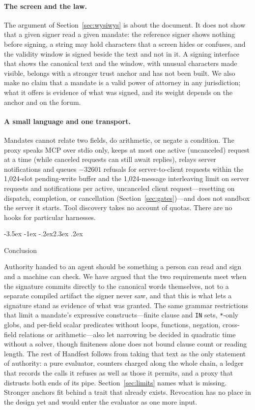 \documentclass[10pt,twocolumn]{article}
\makeatletter
\theoremstyle{plain}
\theoremstyle{definition}
\renewcommand\section{\@startsection{section}{1}{\z@}%
  {-3.5ex \@plus -1ex \@minus -.2ex}{2.3ex \@plus .2ex}%
  {\normalfont\Large\bfseries\raggedright}}
\makeatother
\begin{document}
\paragraph{The screen and the law.}
The argument of Section~\ref{sec:wysiwys} is about the document. It does not show that a given signer read a given mandate: the reference signer shows nothing before signing, a string may hold characters that a screen hides or confuses, and the validity window is signed beside the text and not in it. A signing interface that shows the canonical text and the window, with unusual characters made visible, belongs with a stronger trust anchor and has not been built. We also make no claim that a mandate is a valid power of attorney in any jurisdiction; what it offers is evidence of what was signed, and its weight depends on the anchor and on the forum.

\paragraph{A small language and one transport.}
Mandates cannot relate two fields, do arithmetic, or negate a condition. The proxy speaks MCP over stdio only, keeps at most one active (uncanceled) request at a time (while canceled requests can still await replies), relays server notifications and queues $-32601$ refusals for server-to-client requests within the 1{,}024-slot pending-write buffer and the 1{,}024-message interleaving limit on server requests and notifications per active, uncanceled client request---resetting on dispatch, completion, or cancellation (Section~\ref{sec:gates})---and does not sandbox the server it starts. Tool discovery takes no account of quotas. There are no hooks for particular harnesses.

\section{Conclusion}
\label{sec:conclusion}

Authority handed to an agent should be something a person can read and sign and a machine can check. We have argued that the two requirements meet when the signature commits directly to the canonical words themselves, not to a separate compiled artifact the signer never saw, and that this is what lets a signature stand as evidence of what was granted. The same grammar restrictions that limit a mandate's expressive constructs---finite clause and \texttt{IN} sets, \texttt{*}-only globs, and per-field scalar predicates without loops, functions, negation, cross-field relations or arithmetic---also let narrowing be decided in quadratic time without a solver, though finiteness alone does not bound clause count or reading length. The rest of Handfest follows from taking that text as the only statement of authority: a pure evaluator, counters charged along the whole chain, a ledger that records the calls it refuses as well as those it permits, and a proxy that distrusts both ends of its pipe. Section~\ref{sec:limits} names what is missing. Stronger anchors fit behind a trait that already exists. Revocation has no place in the design yet and would enter the evaluator as one more input.
\end{document}
